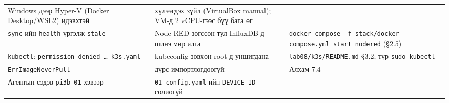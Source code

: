 \begin{longtable}[]{@{}lll@{}}
\begin{minipage}[t]{0.30\columnwidth}
Windows дээр Hyper-V (Docker Desktop/WSL2) идэвхтэй\strut
\end{minipage} & \begin{minipage}[t]{0.30\columnwidth}\raggedright
хүлээгдэх зүйл (VirtualBox manual); VM-д 2 vCPU-гээс бүү бага өг\strut
\end{minipage}\tabularnewline
\begin{minipage}[t]{0.30\columnwidth}\raggedright
\texttt{sync}-ийн \texttt{health} үргэлж \texttt{stale}\strut
\end{minipage} & \begin{minipage}[t]{0.30\columnwidth}\raggedright
Node-RED зогссон тул InfluxDB-д шинэ мөр алга\strut
\end{minipage} & \begin{minipage}[t]{0.30\columnwidth}\raggedright
\texttt{docker\ compose\ -f\ stack/\allowbreak{}docker-compose.\allowbreak{}yml\ start\ nodered} (§2.5)\strut
\end{minipage}\tabularnewline
\begin{minipage}[t]{0.30\columnwidth}\raggedright
\texttt{kubectl}: \texttt{permission\ denied\ \ldots{}\ k3s.\allowbreak{}yaml}\strut
\end{minipage} & \begin{minipage}[t]{0.30\columnwidth}\raggedright
kubeconfig зөвхөн root-д уншигдана\strut
\end{minipage} & \begin{minipage}[t]{0.30\columnwidth}\raggedright
\texttt{lab08/\allowbreak{}k3s/\allowbreak{}README.\allowbreak{}md} §3.2; түр \texttt{sudo\ kubectl}\strut
\end{minipage}\tabularnewline
\begin{minipage}[t]{0.30\columnwidth}\raggedright
\texttt{ErrImageNeverPull}\strut
\end{minipage} & \begin{minipage}[t]{0.30\columnwidth}\raggedright
дүрс импортлогдоогүй\strut
\end{minipage} & \begin{minipage}[t]{0.30\columnwidth}\raggedright
Алхам 7.4\strut
\end{minipage}\tabularnewline
\begin{minipage}[t]{0.30\columnwidth}\raggedright
Агентын сэдэв \texttt{pi3b-01} хэвээр\strut
\end{minipage} & \begin{minipage}[t]{0.30\columnwidth}\raggedright
\texttt{01-config.yaml}-ийн \texttt{DEVICE\_ID} солиогүй\strut
\end{minipage} & \begin{minipage}[t]{0.30\columnwidth}\raggedright

\end{minipage}
\end{longtable}
